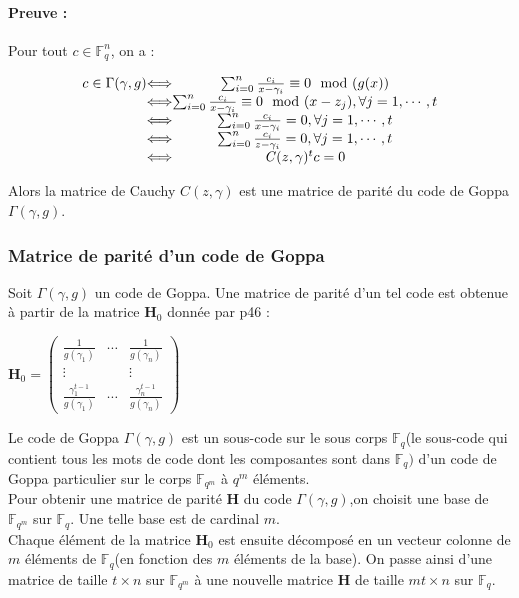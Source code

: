 \documentclass[12pt,openany]{report}
\begin{document}
\paragraph{Preuve :\\}
Pour tout $c \in \mathbb{F}_q^n$, on a :
\begin{center}
\[ 
\left.
\begin{array}{c @{ \Longleftrightarrow}c}
  c \in \Gamma(\gamma,g)& \sum_{i=0}^{n}\frac{c_i}{x-\gamma_i}\equiv 0 \mod (g(x))  \\
  &  \sum_{i=0}^{n}\frac{c_i}{x-\gamma_i}\equiv 0 \mod (x-z_j) , \forall j=1,\cdots,t \\
  &  \sum_{i=0}^{n}\frac{c_i}{x-\gamma_i}= 0 , \forall j=1,\cdots,t\\
 &  \sum_{i=0}^{n}\frac{c_i}{z-\gamma_i}= 0 , \forall j=1,\cdots,t \\
 & \mathit{C}(z,\gamma)^{t}c=0 
  

\end{array}
\right.
\]

\end{center}

Alors la matrice de Cauchy $\mathit{C}(z,\gamma)$ est une matrice de parité du code de Goppa $\Gamma(\gamma,g).$\\
\subsubsection{Matrice de parité d'un code de Goppa}
Soit $\Gamma(\gamma,g) $ un code de Goppa. Une matrice de parité d'un tel code est obtenue à partir de la matrice $\mathbf{H}_0$ donnée par \cite{Ndollane}p46 :
\begin{center}

$\mathbf{H}_0= \begin{pmatrix}
\frac{1}{g(\gamma_1)} & \cdots & \frac{1}{g(\gamma_n)} \\
\vdots&  &\vdots\\
\frac{\gamma_{1}^{t-1}}{g(\gamma_1)}& \cdots& \frac{\gamma_{n}^{t-1}}{g(\gamma_n)}
\end{pmatrix}$

\end{center}
Le code de Goppa $\Gamma(\gamma,g)$ est un sous-code sur le sous corps $\mathbb{F}_q $(le sous-code qui contient tous les mots de code dont les composantes sont dans $\mathbb{F}_q)$ d'un code de Goppa particulier sur le corps $\mathbb{F}_{q^m}$ à $ q^m$ éléments.\\
Pour obtenir une matrice de parité $\mathbf{H}$ du code $\Gamma(\gamma,g)$,on choisit une base de $\mathbb{F}_{q^m}$ sur $\mathbb{F}_{q} $. Une telle base est de cardinal $m$.\\
Chaque élément de la matrice $\mathbf{H}_0$ est ensuite décomposé en un vecteur colonne de $m$ éléments de $\mathbb{F}_q$(en fonction des $m$ éléments de la base). On passe ainsi d'une matrice de taille $t \times n $ sur $\mathbb{F}_{q^m} $ à une nouvelle matrice $\mathbf{H} $ de taille $mt \times n$ sur $\mathbb{F}_q$.\\
\end{document}
